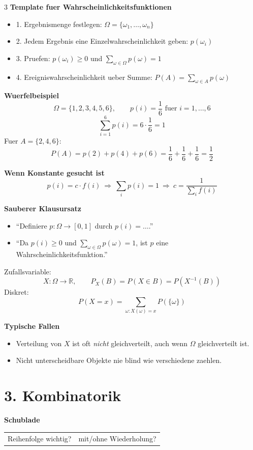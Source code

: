 \documentclass[a4paper,8pt,landscape]{article}
\begin{document}
\begin{multicols*}{3}
\textbf{Template fuer Wahrscheinlichkeitsfunktionen}
\begin{itemize}
  \item 1. Ergebnismenge festlegen: $\Omega=\{\omega_1,\dots,\omega_n\}$
  \item 2. Jedem Ergebnis eine Einzelwahrscheinlichkeit geben: $p(\omega_i)$
  \item 3. Pruefen: $p(\omega_i)\ge 0$ und $\sum_{\omega\in\Omega}p(\omega)=1$
  \item 4. Ereigniswahrscheinlichkeit ueber Summe: $P(A)=\sum_{\omega\in A}p(\omega)$
\end{itemize}

\textbf{Wuerfelbeispiel}
\[
\Omega=\{1,2,3,4,5,6\},\qquad p(i)=\frac16 \text{ fuer } i=1,\dots,6
\]
\[
\sum_{i=1}^6 p(i)=6\cdot \frac16=1
\]
Fuer $A=\{2,4,6\}$:
\[
P(A)=p(2)+p(4)+p(6)=\frac16+\frac16+\frac16=\frac12
\]

\textbf{Wenn Konstante gesucht ist}
\[
p(i)=c\cdot f(i)\ \Rightarrow\ \sum_i p(i)=1\ \Rightarrow\ c=\frac{1}{\sum_i f(i)}
\]

\textbf{Sauberer Klausursatz}
\begin{itemize}
  \item ``Definiere $p:\Omega\to[0,1]$ durch $p(i)=\dots$.''
  \item ``Da $p(i)\ge 0$ und $\sum_{\omega\in\Omega}p(\omega)=1$, ist $p$ eine Wahrscheinlichkeitsfunktion.''
\end{itemize}

Zufallsvariable:
\[
X:\Omega\to\mathbb{R},\qquad P_X(B)=P(X\in B)=P(X^{-1}(B))
\]
Diskret:
\[
P(X=x)=\sum_{\omega:X(\omega)=x}P(\{\omega\})
\]

\textbf{Typische Fallen}
\begin{itemize}
  \item Verteilung von $X$ ist oft \emph{nicht} gleichverteilt, auch wenn $\Omega$ gleichverteilt ist.
  \item Nicht unterscheidbare Objekte nie blind wie verschiedene zaehlen.
\end{itemize}

\section*{3. Kombinatorik}
\textbf{Schublade}
\begin{center}
\begin{tabular}{ll}
Reihenfolge wichtig? & mit/ohne Wiederholung?
\end{tabular}
\end{center}


\end{multicols*}
\end{document}
